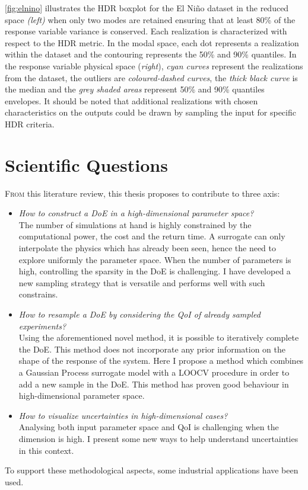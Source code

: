 \cref{fig:elnino} illustrates the HDR boxplot for the El Ni\~no dataset in the reduced space \emph{(left)} when only two modes are retained ensuring that at least 80\% of the response variable variance is conserved. Each realization is characterized with respect to the HDR metric. In the modal space, each dot represents a realization within the dataset and the contouring represents the 50\% and 90\% quantiles. In the response variable physical space (\emph{right}), \emph{cyan curves} represent the realizations from the dataset, the outliers are \emph{coloured-dashed curves}, the \emph{thick black curve} is the median and the \emph{grey shaded areas} represent 50\% and 90\% quantiles envelopes. It should be noted that additional realizations with chosen characteristics on the outputs could be drawn by sampling the input for specific HDR criteria.





\chapter{Scientific Questions}\label{chap:questions}

\lettrine{F}{rom} this literature review, this thesis proposes to contribute to three axis:

\begin{itemize}
\item \emph{How to construct a DoE in a high-dimensional parameter space?}\hfill\\
	The number of simulations at hand is highly constrained by the computational power, the cost and the return time. A surrogate can only interpolate the physics which has already been seen, hence the need to explore uniformly the parameter space. When the number of parameters is high, controlling the sparsity in the DoE is challenging. I have developed a new sampling strategy that is versatile and performs well with such constrains.
	
\item \emph{How to resample a DoE by considering the QoI of already sampled experiments?}\hfill\\
	Using the aforementioned novel method, it is possible to iteratively complete the DoE. This method does not incorporate any prior information on the shape of the response of the system. Here I propose a method which combines a Gaussian Process surrogate model with a LOOCV procedure in order to add a new sample in the DoE. This method has proven good behaviour in high-dimensional parameter space.

\item \emph{How to visualize uncertainties in high-dimensional cases?}\hfill\\
    Analysing both input parameter space and QoI is challenging when the dimension is high. I present some new ways to help understand uncertainties in this context.
\end{itemize}

To support these methodological aspects, some industrial applications have been used.




